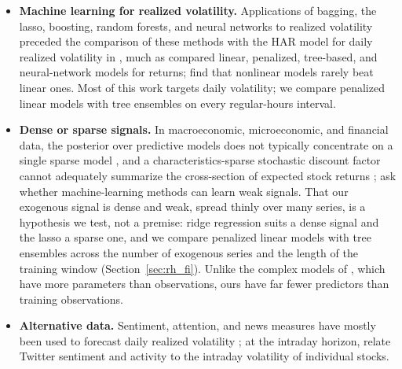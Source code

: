 \begin{itemize}
  realized volatility of related assets that trade while the home market is closed \citep{TodorovaSoucek2014},
  improve volatility forecasts, and for the S\&P~500 futures \citet{StroudJohannes2014} argue that deleting the
  overnight returns removes important information. These studies forecast daily or session volatility; we carry the
  idea to the intraday interval by computing our predictors over the futures' full intraday grid, overnight
  intervals included (Section~\ref{sec:rh_predictors}).
\item \textbf{Machine learning for realized volatility.} Applications of bagging, the lasso, boosting, random
  forests, and neural networks to realized volatility \citep{HillebrandMedeiros2010,AudrinoKnaus2016,
  MittnikRobinzonovSpindler2015,LuongDokuchaev2018,RahimikiaPoon2020} preceded the comparison of these methods with
  the HAR model for daily realized volatility in \citet{christensen2023machine}, much as \citet{gu2020empirical}
  compared linear, penalized, tree-based, and neural-network models for returns; \citet{BrancoRubesamZevallos2024}
  find that nonlinear models rarely beat linear ones. Most of this work targets daily volatility; we compare
  penalized linear models with tree ensembles on every regular-hours interval.
\item \textbf{Dense or sparse signals.} In macroeconomic, microeconomic, and financial data, the posterior over
  predictive models does not typically concentrate on a single sparse model \citep{GiannoneLenzaPrimiceri2021}, and
  a characteristics-sparse stochastic discount factor cannot adequately summarize the cross-section of expected
  stock returns \citep{KozakNagelSantosh2020}; \citet{ShenXiu2025} ask whether machine-learning methods can learn
  weak signals. That our exogenous signal is dense and weak, spread thinly over many series, is a hypothesis we
  test, not a premise: ridge regression suits a dense signal and the lasso a sparse one, and we compare penalized
  linear models with tree ensembles across the number of exogenous series and the length of the training window
  (Section~\ref{sec:rh_fi}). Unlike the complex models of \citet{KellyMalamudZhou2024}, which have more parameters
  than observations, ours have far fewer predictors than training observations.
\item \textbf{Alternative data.} Sentiment, attention, and news measures have mostly been used to forecast daily
  realized volatility \citep{AudrinoSigristBallinari2020,CaporinPoli2017}; at the intraday horizon,
  \citet{BehrendtSchmidt2018} relate Twitter sentiment and activity to the intraday volatility of individual stocks.

\end{itemize}

